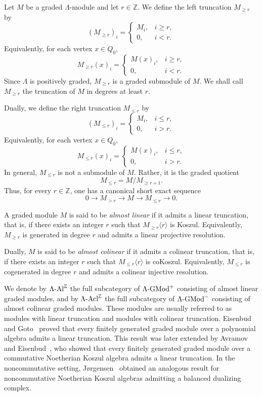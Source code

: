 \documentclass[11pt]{article}
\theoremstyle{definition}
\theoremstyle{remark}
\begin{document}
Let \(M\) be a graded \(\Lambda\)-module and let \(r\in\mathbb{Z}\). We define
the left truncation \(M_{\geq r}\) by
\[
(M_{\geq r})_i =
\begin{cases}
M_i, & i\geq r,\\
0, & i<r.
\end{cases}
\]
Equivalently, for each vertex \(x\in Q_0\),
\[
M_{\geq r}(x)_i =
\begin{cases}
M(x)_i, & i\geq r,\\
0, & i<r.
\end{cases}
\]
Since \(\Lambda\) is positively graded, \(M_{\geq r}\) is a graded submodule of
\(M\). We shall call \(M_{\geq r}\) the truncation of \(M\) in degrees at least
\(r\).

Dually, we define the right truncation \(M_{\leq r}\) by
\[
(M_{\leq r})_i =
\begin{cases}
M_i, & i\leq r,\\
0, & i>r.
\end{cases}
\]
Equivalently, for each vertex \(x\in Q_0\),
\[
M_{\leq r}(x)_i =
\begin{cases}
M(x)_i, & i\leq r,\\
0, & i>r.
\end{cases}
\]
In general, \(M_{\leq r}\) is not a submodule of \(M\). Rather, it is the graded
quotient
\[
M_{\leq r}=M/M_{\geq r+1}.
\]
Thus, for every \(r\in\mathbb{Z}\), one has a canonical short exact sequence
\[
0\longrightarrow M_{> r}
\longrightarrow M
\longrightarrow M_{\leq r}
\longrightarrow 0 .
\]

A graded module \(M\) is said to be \emph{almost linear} if it admits a linear
truncation, that is, if there exists an integer \(r\) such that
\(M_{\geq r}\langle r\rangle\) is Koszul. Equivalently, \(M_{\geq r}\) is
generated in degree \(r\) and admits a linear projective resolution.

Dually, \(M\) is said to be \emph{almost colinear} if it admits a colinear
truncation, that is, if there exists an integer \(r\) such that
\(M_{\leq r}\langle r\rangle\) is coKoszul. Equivalently, \(M_{\leq r}\) is
cogenerated in degree \(r\) and admits a colinear injective resolution.

We denote by
\( 
\Lambda\textup{-Al}^{\mathbb{Z}}
\)
the full subcategory of \(\Lambda\textup{-GMod}^{+}\) consisting of almost
linear graded modules, and by
\( 
\Lambda\textup{-Acl}^{\mathbb{Z}}
\)
the full subcategory of \(\Lambda\textup{-GMod}^{-}\) consisting of almost
colinear graded modules. These modules are usually referred to as modules with linear truncation and
modules with colinear truncation.
Eisenbud and Goto~\cite{18} proved that every finitely generated graded module
over a polynomial algebra admits a linear truncation. This result was later
extended by Avramov and Eisenbud~\cite{2}, who showed that every finitely
generated graded module over a commutative Noetherian Koszul algebra admits a
linear truncation. In the noncommutative setting, J{\o}rgensen~\cite{24}
obtained an analogous result for noncommutative Noetherian Koszul algebras
admitting a balanced dualizing complex.
\end{document}
